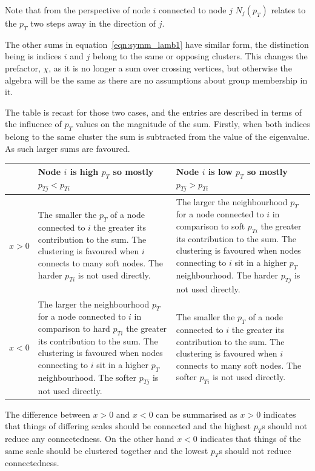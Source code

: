 Note that from the perspective of node \(i\) connected to node \(j\)
\(N_j(p_T)\) relates to the \(p_T\) two steps away in the direction of \(j\).

The other sums in equation~\ref{eqn:symm_lamb1} have similar form,
the distinction being is indices \(i\) and \(j\) belong to the same or opposing clusters.
This changes the prefactor, \(\chi\), as it is no longer a sum over crossing vertices, 
but otherwise the algebra will be the same as there are no assumptions about group membership in it.

The table is recast for those two cases, and the entries are described in terms of the influence of \(p_T\)
values on the magnitude of the sum.
Firstly, when both indices belong to the same cluster the sum is subtracted from the value of the eigenvalue. As such larger sums are favoured.
\begin{center}
    \begin{tabular}{c | p{} p{}}
                & Node \(i\) is high \(p_T\) so mostly \(p_{Tj} < p_{Ti}\) & Node \(i\) is low \(p_T\) so mostly \(p_{Tj} > p_{Ti}\) \\
        \hline
        \(x>0\) & The smaller the \(p_T\) of a node connected to \(i\) the greater its contribution to the sum. The clustering is favoured when \(i\) connects to many soft nodes. The harder \(p_{Ti}\) is not used directly.&
        The larger the neighbourhood \(p_T\) for a node connected to \(i\) in comparison to soft \(p_{Ti}\) the greater its contribution to the sum. The clustering is favoured when nodes connecting to \(i\) sit in a higher \(p_T\) neighbourhood. The harder \(p_{Tj}\) is not used directly.\\
        \(x < 0\) &  The larger the neighbourhood \(p_T\) for a node connected to \(i\) in comparison to hard \(p_{Ti}\) the greater its contribution to the sum. The clustering is favoured when nodes connecting to \(i\) sit in a higher \(p_T\) neighbourhood. The softer \(p_{Tj}\) is not used directly. &
        The smaller the \(p_T\) of a node connected to \(i\) the greater its contribution to the sum. The clustering is favoured when \(i\) connects to many soft nodes. The softer \(p_{Ti}\) is not used directly.\\
    \end{tabular}
\end{center}

The difference between \(x > 0\) and \(x < 0\) can be summarised as \(x > 0\) indicates that things
of differing scales should be connected and the highest \(p_T\)s should not reduce any connectedness.
On the other hand \(x < 0\) indicates that things of the same scale should be clustered together and the lowest \(p_T\)s should not reduce connectedness.



